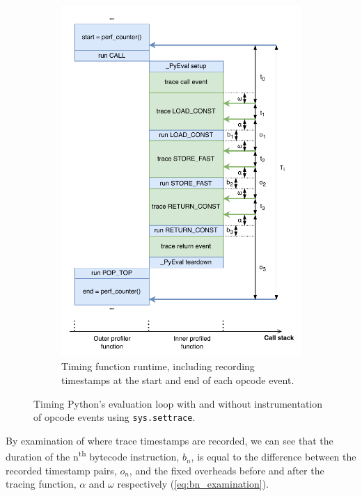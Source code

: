 \begin{figure}[H]
\begin{subfigure}[b]{0.45\textwidth}
       \includegraphics[width=\textwidth]{images/profiling_bytecode/traced_run.drawio.pdf}
       \caption{Timing function runtime, including recording timestamps at the start and end of each opcode event.}
       \label{figure:profiler-traced-run}
    \end{subfigure}
    \caption{Timing Python's evaluation loop with and without instrumentation of opcode events using \texttt{sys.settrace}.}
    \label{figure:profiler-run}
\end{figure}

By examination of where trace timestamps are recorded, we can see that the duration of the n\textsuperscript{th} bytecode instruction, $b_n$, is equal to the difference between the recorded timestamp pairs, $o_n$, and the fixed overheads before and after the tracing function, $\alpha$ and $\omega$ respectively (\autoref{eq:bn_examination}).

